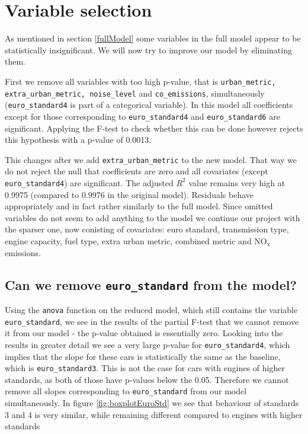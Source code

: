 \documentclass[12pt]{article}
\begin{document}
\section{Variable selection} \label{varSec}
As mentioned in section \ref{fullModel} some variables in the full model appear to be statistically insignificant. We will now try
to improve our model by eliminating them. 

First we remove all variables with too high p-value, that is \texttt{urban\_metric, extra\_urban\_metric, noise\_level} 
and \texttt{co\_emissions}, simultaneously (\texttt{euro\_standard4} is 
part of a categorical variable). In this model all coefficients except for those corresponding to \texttt{euro\_standard4} and 
\texttt{euro\_standard6} are significant. Applying the F-test to check whether this can be done however rejects this hypothesis with
a p-value of 0.0013.

This changes after  we add \texttt{extra\_urban\_metric} to the new model. That way we do not reject the null that coefficients are
zero and all covariates (except \texttt{euro\_standard4}) are significant. The adjusted $R^2$ value
remains very high at 0.9975 (compared to 0.9976 in the original model). Residuals behave appropriately and in fact rather similarly
to the full model. Since omitted variables do not seem to add anything to the model we continue our project with the 
sparser one, now conisting of covariates: euro standard, transmission type, engine capacity, fuel type, extra urban metric, combined metric and 
$\text{NO}_\text{x}$ emissions.

\subsection{Can we remove \texttt{euro\_standard} from the model?}
Using the \texttt{anova} function on the reduced model, which still contains the variable \texttt{euro\_standard}, we see in the results
of the partial F-test that we cannot remove it from our model - the p-value obtained is essentially zero. 
Looking into the results in greater detail 
we see a very large p-value for \texttt{euro\_standard4}, which implies that the slope for these cars is statistically the same as the 
baseline, which is \texttt{euro\_standard3}. This is not the case for cars with engines of higher standards, as both of those have p-values
below the 0.05. Therefore we cannot remove all slopes corresponding to \texttt{euro\_standard} from our model simultaneously. In figure
\ref{fig:boxplotEuroStd} we see that behaviour of standards 3 and 4 is very similar, while remaining different compared to engines with higher standards
\end{document}
